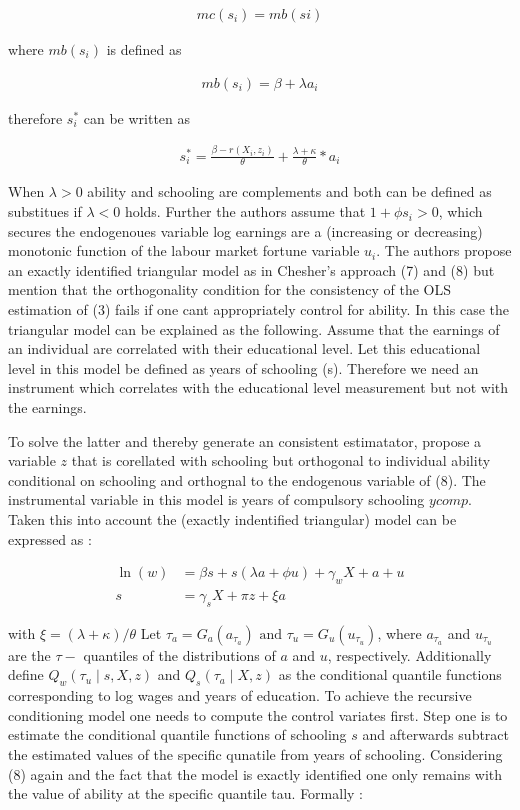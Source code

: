 \documentclass[12pt,a4paper]{article}
\begin{document}
\begin{align}mc(s_i) = mb(si)\end{align}

where \(mb(s_i)\) is defined as

\begin{align} mb(s_i)= \beta + \lambda a_i \end{align}

therefore \(s_i^*\) can be written as

\begin{align} s_i^* = \frac{\beta - r(X_i, z_i)}{\theta} + \frac{\lambda  + \kappa}{\theta}*a_i \end{align}

When \(\lambda>0\) ability and schooling are complements and both can be
defined as substitues if \(\lambda<0\) holds. Further the authors assume
that \(1+ \phi s_i > 0\), which secures the endogenoues variable log
earnings are a (increasing or decreasing) monotonic function of the
labour market fortune variable \(u_i\). The authors propose an exactly
identified triangular model as in Chesher's approach (7) and (8) but
mention that the orthogonality condition for the consistency of the OLS
estimation of (3) fails if one cant appropriately control for ability.
In this case the triangular model can be explained as the following.
Assume that the earnings of an individual are correlated with their
educational level. Let this educational level in this model be defined
as years of schooling (s). Therefore we need an instrument which
correlates with the educational level measurement but not with the
earnings.

To solve the latter and thereby generate an consistent estimatator,
\textcite{brunello} propose a variable \(z\) that is corellated with
schooling but orthogonal to individual ability conditional on schooling
and orthognal to the endogenous variable of (8). The instrumental
variable in this model is years of compulsory schooling \(ycomp\). Taken
this into account the (exactly indentified triangular) model can be
expressed as :

\begin{align} \ln(w)&=\beta s+s(\lambda a+\phi u)+\gamma_{w} X+a+u \\
s&=\gamma_{s} X+\pi z+\xi a \end{align}

with \(\xi=(\lambda+\kappa) / \theta\) Let
\(\tau_{a}=G_{a}\left(a_{\tau_{a}}\right) \text { and } \tau_{u}=G_{u}\left(u_{\tau_{u}}\right)\),
where \(a_{\tau_{a}}\) and \(u_{\tau_{u}}\) are the \(\tau-\) quantiles
of the distributions of \(a\) and \(u\), respectively. Additionally
define \(Q_{w}\left(\tau_{u}\mid s,X,z\right)\) and
\(Q_{s}\left(\tau_{a}\mid X,z\right)\) as the conditional quantile
functions corresponding to log wages and years of education. To achieve
the recursive conditioning model one needs to compute the control
variates first. Step one is to estimate the conditional quantile
functions of schooling \(s\) and afterwards subtract the estimated
values of the specific qunatile from years of schooling. Considering (8)
again and the fact that the model is exactly identified one only remains
with the value of ability at the specific quantile tau. Formally :
\end{document}
